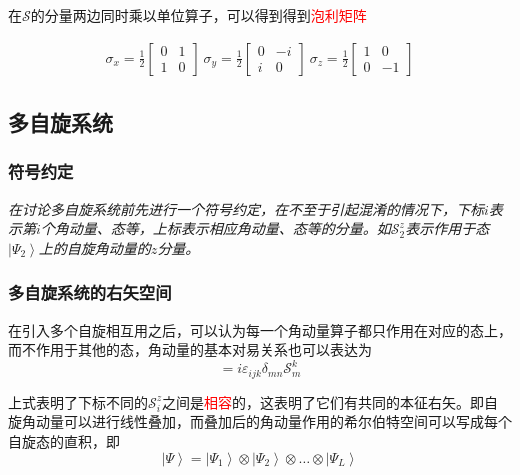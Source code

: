 \documentclass[UTF8,12pt]{article}
\providecommand\Ket[1]{\left|\right. #1 \left.\right\rangle}
\numberwithin{equation}{subsection}
\providecommand{\empR}[1]{\textcolor{red}{#1}}
\begin{document}
	在$\mathcal S$的分量两边同时乘以单位算子，可以得到得到\empR{泡利矩阵}
	\begin{snugshade}
		\begin{equation}
				\begin{aligned}
					\sigma_x = \frac{1}{2}\begin{bmatrix}
						0&1\\
						1&0
					\end{bmatrix}~
					\sigma_y = \frac{1}{2}\begin{bmatrix}
						0&-i\\
						i&0
					\end{bmatrix}~
					\sigma_z = \frac{1}{2}\begin{bmatrix}
						1&0\\
						0&-1
					\end{bmatrix}
				\end{aligned}
				\label{PauliMatrix}
		\end{equation}
	\end{snugshade}
	\subsection{多自旋系统}
	\small
	\subsubsection*{\small{符号约定}}
	\emph{
	在讨论多自旋系统前先进行一个符号约定，在不至于引起混淆的情况下，下标$i$表示第$i$个角动量、态等，上标表示相应角动量、态等的分量。如$\mathcal S^z_2$表示作用于态$\Ket{\varPsi_2}$上的自旋角动量的$z$分量。}
	\normalsize
	\subsubsection{多自旋系统的右矢空间}
	在引入多个自旋相互用之后，可以认为每一个角动量算子都只作用在对应的态上，而不作用于其他的态，角动量的基本对易关系也可以表达为
	\begin{equation}
		[\mathcal S^i_m,\mathcal S^j_n]=i\varepsilon_{ijk}\delta_{mn}\mathcal S^k_m
		\label{exchange}
	\end{equation}
	
	上式表明了下标不同的$\mathcal S^z_i$之间是\empR{相容}的，这表明了它们有共同的本征右矢。即自旋角动量可以进行线性叠加，而叠加后的角动量作用的希尔伯特空间可以写成每个自旋态的直积\cite{Bose}，即$$\Ket{\varPsi} = \Ket{\varPsi_1}\otimes\Ket{\varPsi_2}\otimes\dots\otimes\Ket{\varPsi_L}$$
	
\end{document}
